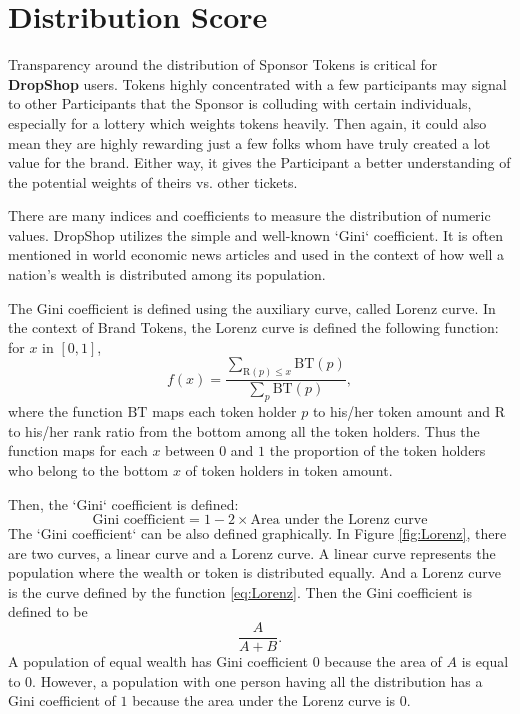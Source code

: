 \documentclass[runningheads]{llncs}
\begin{document}
\section{Distribution Score}\label{APP-DistributionFunctions}
Transparency around the distribution of Sponsor Tokens is critical for \textbf{DropShop} users. Tokens highly concentrated with a few participants may signal to other Participants that the Sponsor is colluding with certain individuals, especially for a lottery which weights tokens heavily. Then again, it could also mean they are highly rewarding just a few folks whom have truly created a lot value for the brand. Either way, it gives the Participant a better understanding of the potential weights of theirs vs. other tickets.

There are many indices and coefficients to measure the distribution of numeric values. DropShop utilizes the simple and well-known `Gini` coefficient. It is often mentioned in world economic news articles and used in the context of how well a nation's wealth is distributed among its population.

The Gini coefficient is defined using the auxiliary curve, called Lorenz curve. In the context of Brand Tokens, the Lorenz curve is defined the following function: for $x$ in $[0,1]$,
\begin{equation}\label{eq:Lorenz}
f(x) =  \frac{ \sum_{\mathrm{R} (p) \leq x} \mathrm{BT} (p) }{\sum_{p} \mathrm{BT} (p)},
\end{equation}
where the function $\mathrm{BT}$ maps each token holder $p$ to his/her token amount and $\mathrm{R}$ to his/her rank ratio from the bottom among all the token holders. Thus the function maps for each $x$ between $0$ and $1$ the proportion of the token holders who belong to the bottom $x$ of token holders in token amount.

Then, the `Gini` coefficient is defined:
$$
\textrm{Gini coefficient} = 1 - 2 \times \textrm{Area under the Lorenz curve}
$$
The `Gini coefficient` can be also defined graphically. In Figure \ref{fig:Lorenz}, there are two curves, a linear curve and a Lorenz curve. A linear curve represents the population where the wealth or token is distributed equally. And a Lorenz curve is the curve defined by the function \ref{eq:Lorenz}. Then the Gini coefficient is defined to be
$$
\frac{A}{A+B}.
$$
A population of equal wealth has Gini coefficient $0$ because the area of $A$ is equal to $0$. However, a population with one person having all the distribution has a Gini coefficient of $1$ because the area under the Lorenz curve is $0$.
\end{document}
